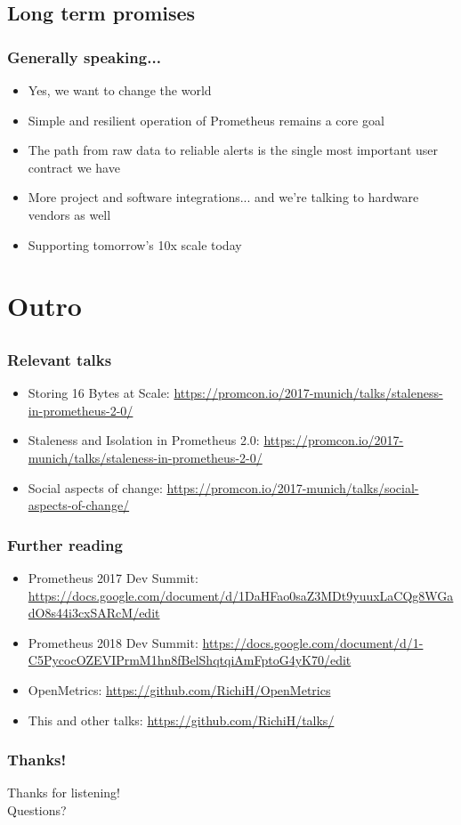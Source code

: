 \documentclass[aspectratio=169]{beamer}
\begin{document}
\subsection{Long term promises}

\begin{frame}
	\frametitle{Generally speaking...}
	\begin{itemize}
		\item Yes, we want to change the world
		\item Simple and resilient operation of Prometheus remains a core goal
		\item The path from raw data to reliable alerts is the single most important user contract we have
		\item More project and software integrations... and we're talking to hardware vendors as well
		\item Supporting tomorrow's 10x scale today
	\end{itemize}
\end{frame}



\section{Outro}


\subsection{}

\begin{frame}
	\frametitle{Relevant talks}
	\begin{itemize}
		\item Storing 16 Bytes at Scale: \url{https://promcon.io/2017-munich/talks/staleness-in-prometheus-2-0/}
		\item Staleness and Isolation in Prometheus 2.0: \url{https://promcon.io/2017-munich/talks/staleness-in-prometheus-2-0/}
		\item Social aspects of change: \url{https://promcon.io/2017-munich/talks/social-aspects-of-change/}
	\end{itemize}
\end{frame}


\begin{frame}
	\frametitle{Further reading}
	\begin{itemize}
		\item Prometheus 2017 Dev Summit: \url{https://docs.google.com/document/d/1DaHFao0saZ3MDt9yuuxLaCQg8WGadO8s44i3cxSARcM/edit}
		\item Prometheus 2018 Dev Summit: \url{https://docs.google.com/document/d/1-C5PycocOZEVIPrmM1hn8fBelShqtqiAmFptoG4yK70/edit}
		\item OpenMetrics: \url{https://github.com/RichiH/OpenMetrics}
		\item This and other talks: \url{https://github.com/RichiH/talks/}
	\end{itemize}
\end{frame}

\begin{frame}
	\frametitle{Thanks!}
		\begin{center}
			\vfill
			Thanks for listening!\\
			\vfill
			Questions?
			\vfill
		\end{center}
\end{frame}
\end{document}
